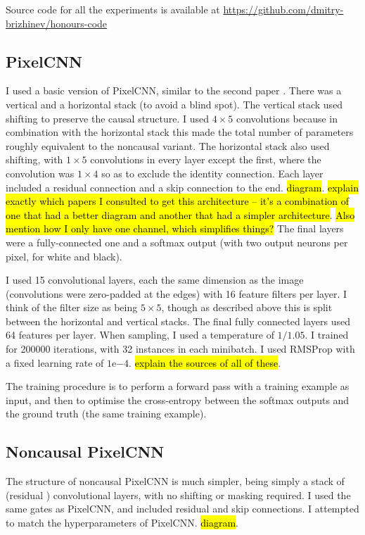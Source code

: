 \documentclass[10pt,a4paper]{article}
\begin{document}
Source code for all the experiments is available at \url{https://github.com/dmitry-brizhinev/honours-code}

\subsection{PixelCNN}

I used a basic version of PixelCNN, similar to the second paper \cite{pixelcnn2}. There was a vertical and a horizontal stack (to avoid a blind spot). The vertical stack used shifting to preserve the causal structure. I used $4\times 5$ convolutions because in combination with the horizontal stack this made the total number of parameters roughly equivalent to the noncausal variant. The horizontal stack also used shifting, with $1\times 5$ convolutions in every layer except the first, where the convolution was $1\times 4$ so as to exclude the identity connection. Each layer included a residual connection and a skip connection to the end. \hl{diagram}. \hl{explain exactly which papers I consulted to get this architecture -- it's a combination of one that had a better diagram and another that had a simpler architecture}. \hl{Also mention how I only have one channel, which simplifies things?} The final layers were a fully-connected one and a softmax output (with two output neurons per pixel, for white and black).

I used 15 convolutional layers, each the same dimension as the image (convolutions were zero-padded at the edges) with 16 feature filters per layer. I think of the filter size as being $5\times 5$, though as described above this is split between the horizontal and vertical stacks. The final fully connected layers used 64 features per layer. When sampling, I used a temperature of $1/1.05$. I trained for 200000 iterations, with 32 instances in each minibatch. I used RMSProp with a fixed learning rate of $1\mathrm{e}{-4}$. \hl{explain the sources of all of these}.

The training procedure is to perform a forward pass with a training example as input, and then to optimise the cross-entropy between the softmax outputs and the ground truth (the same training example).

\subsection{Noncausal PixelCNN}

The structure of noncausal PixelCNN is much simpler, being simply a stack of (residual \cite{resnet}) convolutional layers, with no shifting or masking required. I used the same gates as PixelCNN, and included residual and skip connections. I attempted to match the hyperparameters of PixelCNN. \hl{diagram}.
\end{document}
